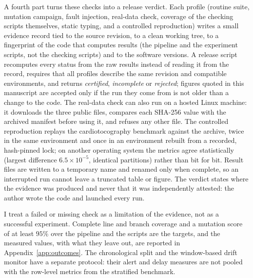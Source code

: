 \documentclass[conference]{IEEEtran}
\begin{document}
A fourth part turns these checks into a release verdict. Each profile (routine
suite, mutation campaign, fault injection, real-data check, coverage of the
checking scripts themselves, static typing, and a controlled reproduction)
writes a small evidence record tied to the source revision, to a clean working
tree, to a fingerprint of the code that computes results (the pipeline and the
experiment scripts, not the checking scripts) and to the software versions. A
release script recomputes every status from the raw results instead of reading
it from the record, requires that all profiles describe the same revision and
compatible environments, and returns \emph{certified}, \emph{incomplete} or
\emph{rejected}; figures quoted in this manuscript are accepted only if the run
they come from is not older than a change to the code. The real-data check can
also run on a hosted Linux machine: it downloads the three public files,
compares each SHA-256 value with the archived manifest before using it, and
refuses any other file. The controlled reproduction replays the cardiotocography
benchmark against the archive, twice in the same environment and once in an
environment rebuilt from a recorded, hash-pinned lock; on another operating
system the metrics agree statistically (largest difference $6.5\times10^{-5}$,
identical partitions) rather than bit for bit. Result files are written to a
temporary name and renamed only when complete, so an interrupted run cannot leave
a truncated table or figure. The verdict states where the evidence was produced
and never that it was independently attested: the author wrote the code and
launched every run.

I treat a failed or missing check as a limitation of the evidence, not as
a successful experiment. Complete line and branch coverage and a mutation
score of at least $95\%$ over the pipeline and the scripts are the targets, and the
measured values, with what they leave out, are reported in
Appendix~\ref{app:outcomes}. The
chronological split and the window-based drift monitor have a separate
protocol: their alert and delay measures are not pooled with the row-level
metrics from the stratified benchmark.
\end{document}
